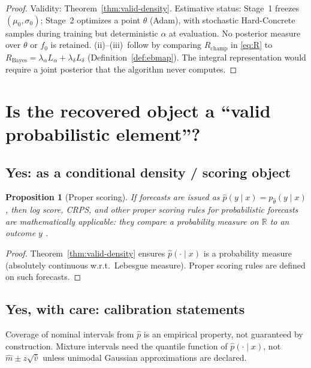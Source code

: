 \documentclass[11pt,a4paper]{article}
\theoremstyle{plain}
\newtheorem{proposition}[theorem]{Proposition}
\theoremstyle{definition}
\theoremstyle{remark}
\newcommand{\R}{\mathbb{R}}
\newcommand{\tht}{\theta}
\begin{document}
\begin{proof}
Validity: Theorem~\ref{thm:valid-density}.
Estimative status: Stage~1 freezes \((\mu_0,\sigma_0)\); Stage~2 optimizes a point
\(\hat\tht\) (Adam), with stochastic Hard-Concrete samples during training but
deterministic \(\alpha\) at evaluation. No posterior measure over \(\tht\) or \(f_0\)
is retained.
(ii)--(iii)~follow by comparing \(R_{\mathrm{champ}}\) in \eqref{eq:R} to
\(R_{\mathrm{Bayes}}=\lambda_\alpha L_\alpha+\lambda_\delta L_\delta\)
(Definition~\ref{def:ebmap}).
The integral representation would require a joint posterior that the algorithm never
computes.
\end{proof}

\section{Is the recovered object a ``valid probabilistic element''?}

\subsection{Yes: as a conditional density / scoring object}
\begin{proposition}[Proper scoring]
If forecasts are issued as \(\hat p(y\mid x)=p_{\hat\tht}(y\mid x)\), then log score,
CRPS, and other proper scoring rules for probabilistic forecasts are
\emph{mathematically applicable}: they compare a probability measure on \(\R\) to an
outcome \(y\)
\citep{GneitingRaftery2007}.
\end{proposition}

\begin{proof}
Theorem~\ref{thm:valid-density} ensures \(\hat p(\cdot\mid x)\) is a probability
measure (absolutely continuous w.r.t.\ Lebesgue measure). Proper scoring rules are
defined on such forecasts.
\end{proof}

\subsection{Yes, with care: calibration statements}
Coverage of nominal intervals from \(\hat p\) is an empirical property, not guaranteed
by construction. Mixture intervals need the quantile function of \(\hat p(\cdot\mid x)\),
not \(\hat m\pm z\sqrt{\hat v}\) unless unimodal Gaussian approximations are declared.
\end{document}
